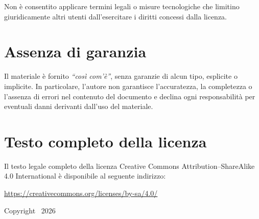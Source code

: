 Non è consentito applicare termini legali o misure tecnologiche che limitino
giuridicamente altri utenti dall'esercitare i diritti concessi dalla licenza.

\vspace{1em}

\section*{Assenza di garanzia}

Il materiale è fornito \emph{``così com'è''}, senza garanzie di alcun tipo,
esplicite o implicite. In particolare, l'autore non garantisce l'accuratezza,
la completezza o l'assenza di errori nel contenuto del documento e declina
ogni responsabilità per eventuali danni derivanti dall'uso del materiale.

\vspace{1em}

\section*{Testo completo della licenza}

Il testo legale completo della licenza Creative Commons Attribution--ShareAlike
4.0 International è disponibile al seguente indirizzo:

\begin{center}
\begin{minipage}{0.9\textwidth}
\centering
\url{https://creativecommons.org/licenses/by-sa/4.0/}
\end{minipage}
\end{center}

\vspace{1em}

\noindent
Copyright \textcopyright\ 2026 \BookAuthor

\setlength{\parskip}{0pt}
\setlength{\parindent}{15pt}